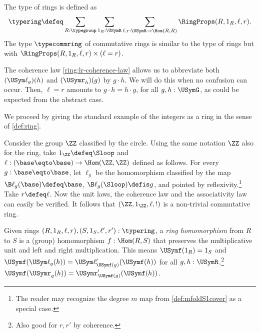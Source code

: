 \begin{definition}\label{def:typering}
The type of rings is defined as
\[
\typering\defeq\sum_{R:\typegroup}\sum_{1_R:\USymR}\sum_{\ell,r:\USymR\to\Hom(R,R)} \RingProps(R,1_R,\ell,r).
\]
The type $\typecommring$ of commutative rings is similar to the type
of rings but with $\RingProps(R,1_R,\ell,r) \times(\ell=r)$. 
\end{definition}

The coherence law \ref{ring:lr-coherence-law} allows us to abbreviate both 
$(\USym\ell_g)(h)$ and $(\USymr_h)(g)$ by $g\cdot h$. We will do this when
no confusion can occur. Then, $\ell=r$ 
amounts to $g\cdot h = h\cdot g$, for all $g,h : \USymG$,
as could be expected from the abstract case.

We proceed by giving the standard example of the integers as a ring
in the sense of \cref{def:ring}.
\begin{example}
Consider the group $\ZZ$ classified by the circle.
Using the same notation $\ZZ$ also for the ring, take $1_\ZZ \defeq\Sloop$
and $\ell: (\base\eqto\base)\to\Hom(\ZZ,\ZZ)$ defined as follows.
For every $g:\base\eqto\base$, let $\ell_g$ be the homomorphism
classified by the map $\B\ell_g(\base)\defeq\base$, 
$\B\ell_g(\Sloop)\defis g$, and pointed by reflexivity.\footnote{%
The reader may recognize the degree $m$
map from \cref{def:mfoldS1cover} as a special case.}
Take $r\defeq\ell$. Now the unit laws, the coherence law and
the associativity law can easily be verified. It follows that
$(\ZZ,1_\ZZ,\ell,!)$ is a non-trivial commutative ring.
\end{example}

\begin{definition}\label{def:ringhom}
Given rings $(R,1_R,\ell,r),(S,1_S,\ell',r') : \typering$,
a \emph{ring homomorphism} from $R$ to $S$ is a (group) homomorphism
$f:\Hom(R,S)$ that preserves the multiplicative unit and 
left and right multiplication. This means $\USymf(1_R) = 1_S$ and
$\USymf(\USym\ell_g(h)) = \USym\ell'_{\USymf(g)}(\USymf(h))$ for
all $g,h:\USymR$.\footnote{Also good for $r,r'$ by coherence.}
$\USymf(\USymr_g(h)) = \USymr'_{\USymf(g)}(\USymf(h))$.
\end{definition}

